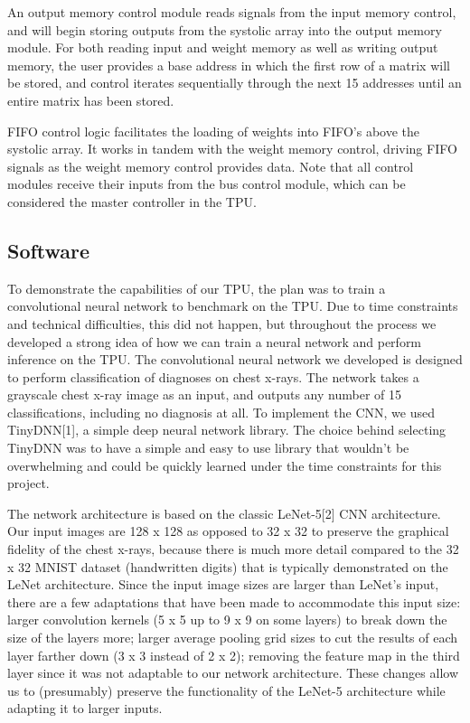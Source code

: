 \documentclass[11pt, conference, onecolumn]{IEEEtran}
\begin{document}
        An output memory control module reads signals from the input memory control, and
        will begin storing outputs from the systolic array into the output memory module.
        For both reading input and weight memory as well as writing output memory, the
        user provides a base address in which the first row of a matrix will be stored,
        and control iterates sequentially through the next 15 addresses until an entire
        matrix has been stored.

        FIFO control logic facilitates the loading of weights into FIFO's above the
        systolic array. It works in tandem with the weight memory control, driving FIFO
        signals as the weight memory control provides data. Note that all control
        modules receive their inputs from the bus control module, which can be considered
        the master controller in the TPU.

    \subsection{Software}
    To demonstrate the capabilities of our TPU, the plan was to train a convolutional
    neural network to benchmark on the TPU. Due to time constraints and technical
    difficulties, this did not happen, but throughout the process we developed a strong
    idea of how we can train a neural network and perform inference on the TPU. The
    convolutional neural network we developed is designed to perform classification of
    diagnoses on chest x-rays. The network takes a grayscale chest x-ray image as an
    input, and outputs any number of 15 classifications, including no diagnosis at all. To
    implement the CNN, we used TinyDNN[1], a simple deep neural network library. The
    choice behind selecting TinyDNN was to have a simple and easy to use library that
    wouldn’t be overwhelming and could be quickly learned under the time constraints for
    this project.

    The network architecture is based on the classic LeNet-5[2] CNN architecture. Our
    input images are 128 x 128 as opposed to 32 x 32 to preserve the graphical fidelity of
    the chest x-rays, because there is much more detail compared to the 32 x 32 MNIST
    dataset (handwritten digits) that is typically demonstrated on the LeNet architecture.
    Since the input image sizes are larger than LeNet’s input, there are a few adaptations
    that have been made to accommodate this input size: larger convolution kernels
    (5 x 5 up to 9 x 9 on some layers) to break down the size of the layers more; larger
    average pooling grid sizes to cut the results of each layer farther down
    (3 x 3 instead of 2 x 2); removing the feature map in the third layer since it was not
    adaptable to our network architecture. These changes allow us to (presumably) preserve
    the functionality of the LeNet-5 architecture while adapting it to larger inputs.
\end{document}
